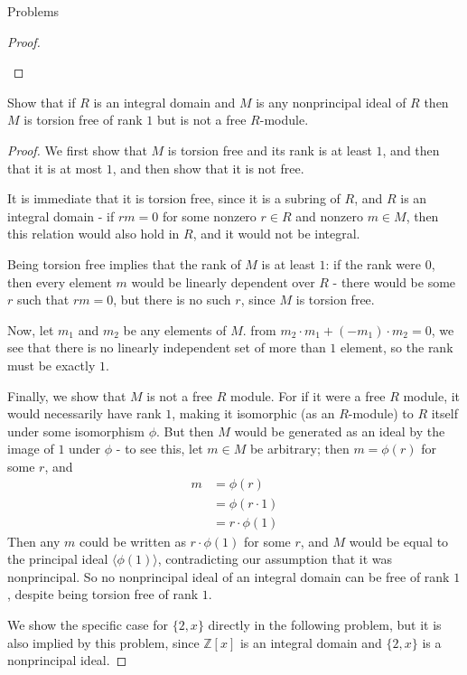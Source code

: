 \documentclass[12pt]{article}
\newcommand{\Z}{\mathbb{Z}}
\theoremstyle{definition}
\newenvironment{problem}[2][Problem]{\begin{trivlist}
\item[\hskip \labelsep {\bfseries #1}\hskip \labelsep {\bfseries #2.}]}{\end{trivlist}}
\begin{document}
\begin{section}{Problems}
\begin{proof}
\begin{enumerate}[label=(\alph*)]
\end{enumerate}
\end{proof}
\begin{problem}{2}
Show that if $R$ is an integral domain and $M$ is any nonprincipal ideal of $R$ then $M$ is torsion free of rank $1$ but is not a free $R$-module.
\end{problem}
\begin{proof}
We first show that $M$ is torsion free and its rank is at least $1$, and then that it is at most $1$, and then show that it is not free.
\par It is immediate that it is torsion free, since it is a subring of $R$, and $R$ is an integral domain - if $rm = 0$ for some nonzero $r \in R$ and nonzero $m \in M$, then this relation would also hold in $R$, and it would not be integral.
\par Being torsion free implies that the rank of $M$ is at least $1$: if the rank were $0$, then every element $m$ would be linearly dependent over $R$ - there would be some $r$ such that $rm = 0$, but there is no such $r$, since $M$ is torsion free.
\par Now, let $m_1$ and $m_2$ be any elements of $M$. from $m_2 \cdot m_1 + (-m_1) \cdot m_2 = 0$, we see that there is no linearly independent set of more than $1$ element, so the rank must be exactly $1$.
\par Finally, we show that $M$ is not a free $R$ module. For if it were a free $R$ module, it would necessarily have rank $1$, making it isomorphic (as an $R$-module) to $R$ itself under some isomorphism $\phi$. But then $M$ would be generated as an ideal by the image of $1$ under $\phi$ - to see this, let $m \in M$ be arbitrary; then $m = \phi(r)$ for some $r$, and
\begin{align*}
m &= \phi(r)\\ 
&= \phi(r \cdot 1)\\
&= r \cdot \phi(1)
\end{align*}
Then any $m$ could be written as $r \cdot \phi(1)$ for some $r$, and $M$ would be equal to the principal ideal $\langle \phi(1)\rangle$, contradicting our assumption that it was nonprincipal. So no nonprincipal ideal of an integral domain can be free of rank $1$, despite being torsion free of rank $1$.
\par We show the specific case for $\{2,x\}$ directly in the following problem, but it is also implied by this problem, since $\Z[x]$ is an integral domain and $\{2,x\}$ is a nonprincipal ideal.
\end{proof}
\end{section}
\end{document}
